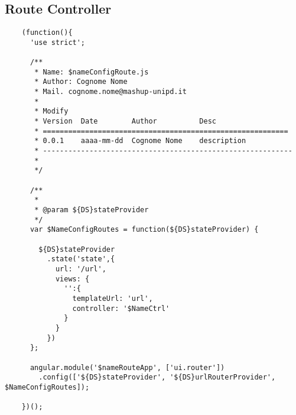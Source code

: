 	\subsection{Route Controller} %
	\label{sub:route_controller}
	\begin{verbatim}
	(function(){
	  'use strict';

	  /**
	   * Name: $nameConfigRoute.js
	   * Author: Cognome Nome
	   * Mail. cognome.nome@mashup-unipd.it
	   *
	   * Modify
	   * Version  Date        Author          Desc
	   * ==========================================================
	   * 0.0.1    aaaa-mm-dd  Cognome Nome    description
	   * -----------------------------------------------------------
	   *
	   */

	  /**
	   *
	   * @param ${DS}stateProvider
	   */
	  var $NameConfigRoutes = function(${DS}stateProvider) {

	    ${DS}stateProvider
	      .state('state',{
	        url: '/url',
	        views: {
	          '':{
	            templateUrl: 'url',
	            controller: '$NameCtrl'
	          }
	        }
	      })
	  };

	  angular.module('$nameRouteApp', ['ui.router'])
	    .config(['${DS}stateProvider', '${DS}urlRouterProvider', $NameConfigRoutes]);

	})();
	\end{verbatim}

